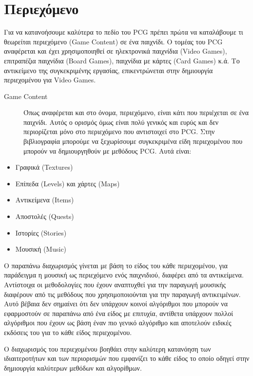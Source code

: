 \section{Περιεχόμενο}
Για να κατανοήσουμε καλύτερα το πεδίο του PCG πρέπει πρώτα να καταλάβουμε τι θεωρείται περιεχόμενο (Game Content) σε ένα παιχνίδι. Ο τομέας του PCG αναφέρεται και έχει χρησιμοποιηθεί σε ηλεκτρονικά παιχνίδια (Video Games), επιτραπέζια παιχνίδια (Board Games), παιχνίδια με κάρτες (Card Games) κ.ά. Το αντικείμενο της συγκεκριμένης εργασίας, επικεντρώνεται στην δημιουργία περιεχομένου για Video Games.

\begin{description}
\item [Game Content] Όπως αναφέρεται και στο όνομα, περιεχόμενο, είναι κάτι που περιέχεται σε ένα παιχνίδι. Αυτός ο ορισμός όμως είναι πολύ γενικός και ευρύς και δεν περιορίζεται μόνο στο περιεχόμενο που αντιστοιχεί στο PCG. Στην βιβλιογραφία μπορούμε να ξεχωρίσουμε συγκεκριμένα είδη περιεχομένου \cite{typesofcontent} που μπορούν να δημιουργηθούν με μεθόδους PCG. Αυτά είναι:
\end{description}

\begin{itemize}
  \item Γραφικά (Textures)
  \item Επίπεδα (Levels) και χάρτες (Maps)
   \item Αντικείμενα (Items)
   \item Αποστολές (Quests)
   \item Ιστορίες (Stories)
   \item Μουσική (Music)
\end{itemize}

Ο παραπάνω διαχωρισμός γίνεται με βάση το είδος του κάθε περιεχομένου, για παράδειγμα η μουσική ως περιεχόμενο ενός παιχνιδιού, διαφέρει από τα αντικείμενα. Αντίστοιχα οι μεθοδολογίες που έχουν αναπτυχθεί για την παραγωγή μουσικής διαφέρουν από τις μεθόδους που χρησιμοποιούνται για την παραγωγή αντικειμένων. Αυτό βέβαια δεν σημαίνει ότι δεν υπάρχουν κοινοί αλγόριθμοι που μπορούν να εφαρμοστούν σε παραπάνω από ένα είδος με επιτυχία, αντίθετα υπάρχουν πολλοί αλγόριθμοι που έχουν ως βάση έναν πιο γενικό αλγόριθμο και αποτελούν ειδικές εκδόσεις του για το κάθε είδος περιεχομένου.
\par
Ο διαχωρισμός του περιεχομένου βοηθάει στην καλύτερη κατανόηση των ιδιαιτεροτήτων και των περιορισμών που εμφανίζει το κάθε είδος το οποίο οδηγεί στην δημιουργία καλύτερων μεθόδων και αλγορίθμων.

